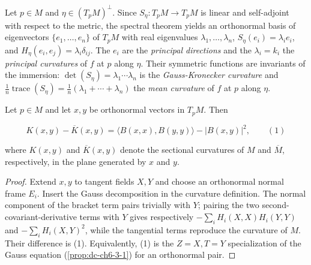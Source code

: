 \begin{definition}
  \label{def:dc-ch6-2-4-principal}
  \leanok
  Let $p\in M$ and $\eta\in(T_pM)^\perp$. Since $S_\eta:T_pM\to T_pM$ is linear
  and self-adjoint with respect to the metric, the spectral theorem yields an
  orthonormal basis of eigenvectors $\{e_1,\dots,e_n\}$ of $T_pM$ with real
  eigenvalues $\lambda_1,\dots,\lambda_n$, $S_\eta(e_i)=\lambda_ie_i$, and
  $H_\eta(e_i,e_j)=\lambda_i\delta_{ij}$. The $e_i$ are the \emph{principal
  directions} and the $\lambda_i=k_i$ the \emph{principal curvatures} of $f$ at
  $p$ along $\eta$. Their symmetric functions are invariants of the immersion:
  $\det(S_\eta)=\lambda_1\cdots\lambda_n$ is the \emph{Gauss-Kronecker
  curvature} and $\frac1n\operatorname{trace}(S_\eta)
  =\frac1n(\lambda_1+\cdots+\lambda_n)$ the \emph{mean curvature} of $f$ at $p$
  along $\eta$.
\end{definition}

\begin{theorem}[Gauss]
  \label{thm:dc-ch6-2-5}
  \leanok
  Let $p\in M$ and let $x,y$ be orthonormal vectors in $T_pM$. Then

  $$
  K(x,y)-\overline{K}(x,y)=\langle B(x,x),B(y,y)\rangle-|B(x,y)|^2,\qquad(1)
  $$

  where $K(x,y)$ and $\overline{K}(x,y)$ denote the sectional curvatures of $M$ and
  $\overline{M}$, respectively, in the plane generated by $x$ and $y$.
\end{theorem}
\begin{proof}
  \leanok
  \sketch
  Extend $x,y$ to tangent fields $X,Y$ and choose an orthonormal normal frame
  $E_i$. Insert the Gauss decomposition in the curvature definition. The normal
  component of the bracket term pairs trivially with $Y$; pairing the two
  second-covariant-derivative terms with $Y$ gives respectively
  $-\sum_iH_i(X,X)H_i(Y,Y)$ and $-\sum_iH_i(X,Y)^2$, while the tangential
  terms reproduce the curvature of $M$. Their difference is (1). Equivalently,
  (1) is the $Z=X,T=Y$ specialization of the Gauss equation
  (\cref{prop:dc-ch6-3-1}) for an orthonormal pair.
\end{proof}

